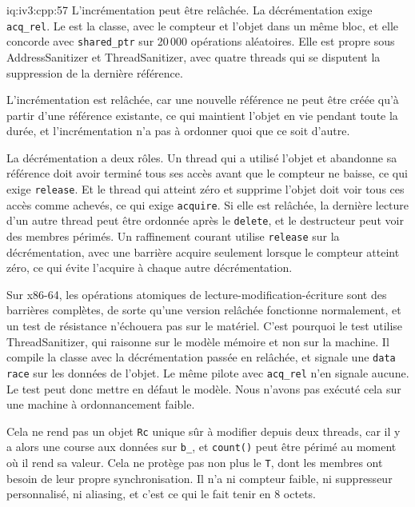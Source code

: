 \begin{solution}{iq:iv3:cpp:57}
L'incrémentation peut être relâchée. La décrémentation exige \texttt{acq\_rel}. Le  est la classe, avec le compteur et l'objet dans un même bloc, et elle concorde avec \texttt{shared\_ptr} sur 20\,000 opérations aléatoires. Elle est propre sous AddressSanitizer et ThreadSanitizer, avec quatre threads qui se disputent la suppression de la dernière référence.
\label{lst:iv3:cp:rc}

L'incrémentation est relâchée, car une nouvelle référence ne peut être créée qu'à partir d'une référence existante, ce qui maintient l'objet en vie pendant toute la durée, et l'incrémentation n'a pas à ordonner quoi que ce soit d'autre.

La décrémentation a deux rôles. Un thread qui a utilisé l'objet et abandonne sa référence doit avoir terminé tous ses accès avant que le compteur ne baisse, ce qui exige \texttt{release}. Et le thread qui atteint zéro et supprime l'objet doit voir tous ces accès comme achevés, ce qui exige \texttt{acquire}. Si elle est relâchée, la dernière lecture d'un autre thread peut être ordonnée après le \texttt{delete}, et le destructeur peut voir des membres périmés. Un raffinement courant utilise \texttt{release} sur la décrémentation, avec une barrière acquire seulement lorsque le compteur atteint zéro, ce qui évite l'acquire à chaque autre décrémentation.

Sur x86-64, les opérations atomiques de lecture-modification-écriture sont des barrières complètes, de sorte qu'une version relâchée fonctionne normalement, et un test de résistance n'échouera pas sur le matériel. C'est pourquoi le test utilise ThreadSanitizer, qui raisonne sur le modèle mémoire et non sur la machine. Il compile la classe avec la décrémentation passée en relâchée, et signale une \texttt{data race} sur les données de l'objet. Le même pilote avec \texttt{acq\_rel} n'en signale aucune. Le test peut donc mettre en défaut le modèle. Nous n'avons pas exécuté cela sur une machine à ordonnancement faible.

Cela ne rend pas un objet \texttt{Rc} unique sûr à modifier depuis deux threads, car il y a alors une course aux données sur \texttt{b\_}, et \texttt{count()} peut être périmé au moment où il rend sa valeur. Cela ne protège pas non plus le \texttt{T}, dont les membres ont besoin de leur propre synchronisation. Il n'a ni compteur faible, ni suppresseur personnalisé, ni aliasing, et c'est ce qui le fait tenir en 8 octets.

\end{solution}


